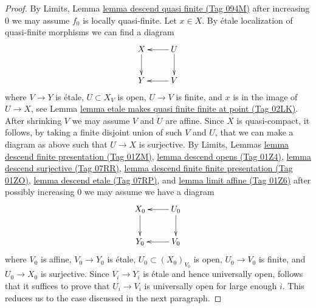 \documentclass{amsart}
\theoremstyle{plain}
\theoremstyle{definition}
\theoremstyle{remark}
\numberwithin{equation}{subsection}
\begin{document}
\begin{proof}
By Limits, Lemma \href{https://stacks.math.columbia.edu/tag/094M}{lemma descend quasi finite (Tag 094M)} after increasing
$0$ we may assume $f_0$ is locally quasi-finite. Let $x \in X$.
By \'etale localization of quasi-finite
morphisms we can find a diagram
$$
\xymatrix{
X \ar[d] & U \ar[l] \ar[d] \\
Y & V \ar[l]
}
$$
where $V \to Y$ is \'etale, $U \subset X_V$ is open, $U \to V$ is finite,
and $x$ is in the image of $U \to X$, see
Lemma \href{https://stacks.math.columbia.edu/tag/02LK}{lemma etale makes quasi finite finite at point (Tag 02LK)}.
After shrinking $V$ we may assume $V$ and $U$ are affine.
Since $X$ is quasi-compact, it follows, by taking a finite disjoint
union of such $V$ and $U$, that we can make a diagram as above
such that $U \to X$ is surjective. By
Limits, Lemmas \href{https://stacks.math.columbia.edu/tag/01ZM}{lemma descend finite presentation (Tag 01ZM)},
\href{https://stacks.math.columbia.edu/tag/01Z4}{lemma descend opens (Tag 01Z4)},
\href{https://stacks.math.columbia.edu/tag/07RR}{lemma descend surjective (Tag 07RR)},
\href{https://stacks.math.columbia.edu/tag/01ZO}{lemma descend finite finite presentation (Tag 01ZO)},
\href{https://stacks.math.columbia.edu/tag/07RP}{lemma descend etale (Tag 07RP)}, and
\href{https://stacks.math.columbia.edu/tag/01Z6}{lemma limit affine (Tag 01Z6)} after possibly increasing $0$
we may assume we have a diagram
$$
\xymatrix{
X_0 \ar[d] & U_0 \ar[l] \ar[d] \\
Y_0 & V_0 \ar[l]
}
$$
where $V_0$ is affine, $V_0 \to Y_0$ is \'etale,
$U_0 \subset (X_0)_{V_0}$ is open, $U_0 \to V_0$ is finite,
and $U_0 \to X_0$ is surjective. Since $V_i \to Y_i$ is \'etale
and hence universally open, follows that it suffices
to prove that $U_i \to V_i$ is universally open for large
enough $i$. This reduces us to the case discussed in the next
paragraph.


\end{proof}
\end{document}
